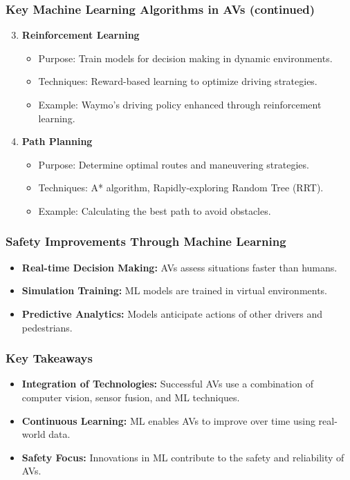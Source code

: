 \documentclass{beamer}
\begin{document}
\begin{frame}[fragile]
    \frametitle{Key Machine Learning Algorithms in AVs (continued)}
    \begin{enumerate}
        \setcounter{enumi}{2}
        \item \textbf{Reinforcement Learning}
            \begin{itemize}
                \item Purpose: Train models for decision making in dynamic environments.
                \item Techniques: Reward-based learning to optimize driving strategies.
                \item Example: Waymo's driving policy enhanced through reinforcement learning.
            \end{itemize}
        \item \textbf{Path Planning}
            \begin{itemize}
                \item Purpose: Determine optimal routes and maneuvering strategies.
                \item Techniques: A* algorithm, Rapidly-exploring Random Tree (RRT).
                \item Example: Calculating the best path to avoid obstacles.
            \end{itemize}
    \end{enumerate}
\end{frame}

\begin{frame}[fragile]
    \frametitle{Safety Improvements Through Machine Learning}
    \begin{itemize}
        \item \textbf{Real-time Decision Making:} AVs assess situations faster than humans.
        \item \textbf{Simulation Training:} ML models are trained in virtual environments.
        \item \textbf{Predictive Analytics:} Models anticipate actions of other drivers and pedestrians.
    \end{itemize}
\end{frame}

\begin{frame}[fragile]
    \frametitle{Key Takeaways}
    \begin{itemize}
        \item \textbf{Integration of Technologies:} Successful AVs use a combination of computer vision, sensor fusion, and ML techniques.
        \item \textbf{Continuous Learning:} ML enables AVs to improve over time using real-world data.
        \item \textbf{Safety Focus:} Innovations in ML contribute to the safety and reliability of AVs.
    \end{itemize}
\end{frame}
\end{document}
